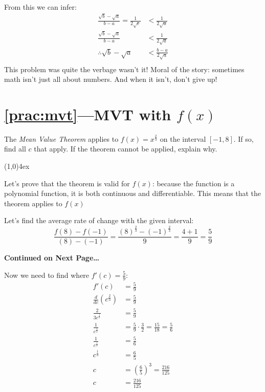 \documentclass{MathNotes}
\newcommand{\continued}{
	\mbox{}
	\vfill
	\textbf{Continued on Next Page\ldots}\newpage
}
\newcommand{\br}{
	\begin{center}
		\line(1,0){4ex}
	\end{center}}
\begin{document}
From this we can infer:
\begin{align*}
	\frac{\sqrt{b}-\sqrt{a}}{b-a}=\frac{1}{2\sqrt{c}} & <\frac{1}{2\sqrt{a}}   \\
	\frac{\sqrt{b}-\sqrt{a}}{b-a}                     & <\frac{1}{2\sqrt{a}}   \\
	\therefore\sqrt{b}-\sqrt{a}                       & <\frac{b-a}{2\sqrt{a}} \\
\end{align*}
This problem was quite the verbage wasn't it! Moral of the story: sometimes
math isn't just all about numbers. And when it isn't, don't give up!

\section*{\ref{prac:mvt}---MVT with $f(x)$}\label{ans:mvt}
The \textit{Mean Value Theorem} applies to $f(x)=x^{\frac{2}{3}}$ on the
interval $[-1, 8]$. If so, find all $c$ that apply. If the theorem cannot
be applied, explain why.
\br
{}
Let's prove that the theorem is valid for $f(x)$: because the function is
a polynomial function, it is both continuous and differentiable. This means
that the theorem applies to $f(x)$

Let's find the average rate of change with the given interval:
\begin{displaymath}
	\frac{f(8)-f(-1)}{(8)-(-1)}=\frac{(8)^{\frac{2}{3}}-(-1)^{\frac{2}{3}}}{9}
	=\frac{4+1}{9}=\frac{5}{9}
\end{displaymath}
\continued
Now we need to find where $f'(c)=\frac{5}{9}$:
\begin{align*}
	f'(c)                       & =\frac{5}{9}                                           \\
	\frac{d}{dc}(c^\frac{2}{3}) & =\frac{5}{9}                                           \\
	\frac{2}{3c^{\frac{1}{3}}}  & =\frac{5}{9}                                           \\
	\frac{1}{c^{\frac{1}{3}}}   & =\frac{5}{9}\cdot\frac{3}{2}=\frac{15}{18}=\frac{5}{6} \\
	\frac{1}{c^{\frac{1}{3}}}   & =\frac{5}{6}                                           \\
	c^{\frac{1}{3}}             & =\frac{6}{5}                                           \\
	c                           & =(\frac{6}{5})^3=\frac{216}{125}                       \\
	c                           & =\frac{216}{125}                                       \\
\end{align*}
\end{document}
